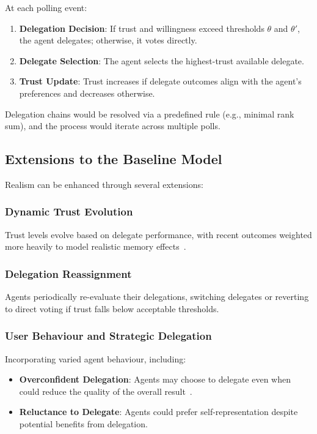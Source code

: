 At each polling event:

\begin{enumerate}
    \item \textbf{Delegation Decision}: If trust and willingness exceed thresholds $\theta$ and $\theta'$, the agent delegates; otherwise, it votes directly.
    \item \textbf{Delegate Selection}: The agent selects the highest-trust available delegate.
    \item \textbf{Trust Update}: Trust increases if delegate outcomes align with the agent's preferences and decreases otherwise.
\end{enumerate}

Delegation chains would be resolved via a predefined rule (e.g., minimal rank sum), and the process would iterate across multiple polls.

\subsection{Extensions to the Baseline Model}

Realism can be enhanced through several extensions:

\subsubsection{Dynamic Trust Evolution}

Trust levels evolve based on delegate performance, with recent outcomes weighted more heavily to model realistic memory effects~\citep{casella_2022}.

\subsubsection{Delegation Reassignment}

Agents periodically re-evaluate their delegations, switching delegates or reverting to direct voting if trust falls below acceptable thresholds.

\subsubsection{User Behaviour and Strategic Delegation}

Incorporating varied agent behaviour, including:

\begin{itemize}
    \item \textbf{Overconfident Delegation}: Agents may choose to delegate even when could reduce the quality of the overall result~\citep{casella_2022}.
    \item \textbf{Reluctance to Delegate}: Agents could prefer self-representation despite potential benefits from delegation.
\end{itemize}

